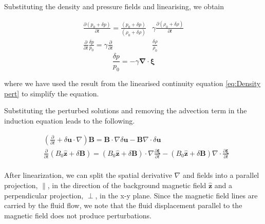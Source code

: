 Substituting the density and pressure fields and linearising, we obtain

\begin{equation*}
  \begin{split}
    \frac{\partial (p_0 +\delta p)}{\partial t} = \frac{(p_0 +\delta p)}{(\rho_0 +\delta \rho)}&\gamma \frac{\partial (\rho_0 +\delta \rho)}{\partial t}\\
    \frac{\partial }{\partial t}\frac{\delta p}{p_0} = \gamma \frac{\partial }{\partial t}&\frac{\delta \rho}{\rho_0}
  \end{split}
\end{equation*}
\begin{equation}
    \frac{\delta p}{p_0} = - \gamma \boldsymbol{\nabla}\cdot \boldsymbol{\xi} 
    \label{eq:Pressure pert}
\end{equation}

where we have used the result from the linearised continuity equation \eqref{eq:Density pert} to simplify the equation.

Substituting the perturbed solutions and removing the advection term in the induction equation leads to the following.

\begin{equation*}
 \begin{split}
    &\left( \frac{\partial}{\partial t} + \delta \boldsymbol{u}\cdot\nabla \right)\boldsymbol{B}
    = \boldsymbol{B}\cdot\nabla\delta\boldsymbol{u} - \boldsymbol{B}\nabla\cdot \delta\boldsymbol{u}\\
    &\frac{\partial}{\partial t} (B_0 \hat{\boldsymbol{z}} +\delta \boldsymbol{B})
    = (B_0\hat{\boldsymbol{z}} +\delta \boldsymbol{B})\cdot \nabla \frac{\partial\boldsymbol{\xi}}{\partial t} - (B_0\hat{\boldsymbol{z}} +\delta \boldsymbol{B})\nabla\cdot\frac{\partial\boldsymbol{\xi}}{\partial t} \\
   \end{split}
\end{equation*}

After linearization, we can split the spatial derivative \(\nabla\) and fields into a parallel projection, \(\parallel\), in the direction of the background magnetic field \(\hat{\boldsymbol{z}}\) and a perpendicular projection, \(\perp\), in the x-y plane. Since the magnetic field lines are carried by the fluid flow, we note that the fluid displacement parallel to the magnetic field does not produce perturbations.

